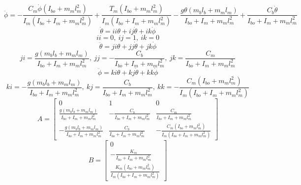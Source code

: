 \documentclass[12pt]{article}
\begin{document}
		\begin{equation}
			\ddot\phi = -\frac{C_m\dot\phi(I_{bo}+m_ml_m^2)}{I_m(I_{bo}+I_m+m_ml_m^2)} + \frac{T_m(I_{bo}+m_ml_m^2)}{I_m(I_{bo}+I_m+m_ml_m^2)} - \frac{g\theta(m_bl_b+m_ml_m)}{I_{bo}+I_m+m_ml_m^2} + \frac{C_b\dot\theta}{I_{bo}+I_m+m_ml_m^2}
		\end{equation}
		\begin{equation}
			\dot\theta = ii\theta + ij\dot\theta + ik\dot\phi
		\end{equation}
		\begin{equation}
			ii = 0,\ ij = 1,\ ik = 0
		\end{equation}
		\begin{equation}
			\ddot\theta = ji\theta + jj\dot\theta + jk\dot\phi
		\end{equation}
		\begin{equation}
			ji = \frac{g(m_bl_b+m_ml_m)}{I_{bo}+I_m+m_ml_m^2},\ jj = -\frac{C_b}{I_{bo}+I_m+m_ml_m^2},\ jk = \frac{C_m}{I_{bo}+I_m+m_ml_m^2}
		\end{equation}
		\begin{equation}
			\ddot\phi = ki\theta + kj\dot\theta + kk\dot\phi
		\end{equation}
		\begin{equation}
			ki = -\frac{g(m_bl_b+m_ml_m)}{I_{bo}+I_m+m_ml_m^2},\ kj = \frac{C_b}{I_{bo}+I_m+m_ml_m^2},\ kk = -\frac{C_m(I_{bo}+m_ml_m^2)}{I_m(I_{bo}+I_m+m_ml_m^2)}
		\end{equation}
		\begin{equation}
			\boxed{
				A = 
				\begin{bmatrix}
					0 & 1 & 0 \\ 
					\frac{g(m_bl_b+m_ml_m)}{I_{bo}+I_m+m_ml_m^2} & -\frac{C_b}{I_{bo}+I_m+m_ml_m^2} & \frac{C_m}{I_{bo}+I_m+m_ml_m^2} \\ 
					-\frac{g(m_bl_b+m_ml_m)}{I_{bo}+I_m+m_ml_m^2} & \frac{C_b}{I_{bo}+I_m+m_ml_m^2} & -\frac{C_m(I_{bo}+m_ml_m^2)}{I_m(I_{bo}+I_m+m_ml_m^2)}
				\end{bmatrix}
			}
		\end{equation}
		\begin{equation}
			\boxed{
			B = 
			\begin{bmatrix}
				0 \\ 
				-\frac{K_m}{I_{bo}+I_m+m_ml_m^2} \\
				\frac{K_m(I_{bo}+m_ml_m^2)}{I_m(I_{bo}+I_m+m_ml_m^2)}
			\end{bmatrix}
			}
		\end{equation}
\end{document}
